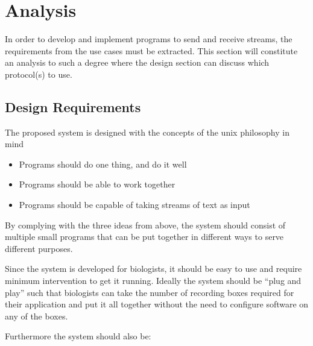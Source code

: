 \chapter{Analysis}
In order to develop and implement programs to send and receive streams, the requirements from the use cases must be extracted.
This section will constitute an analysis to such a degree where the design section can discuss which protocol(s) to use.

\section{Design Requirements}
The proposed system is designed with the concepts of the unix philosophy in mind
\begin{itemize}
	\item Programs should do one thing, and do it well
	\item Programs should be able to work together
	\item Programs should be capable of taking streams of text as input
\end{itemize}

By complying with the three ideas from above, the system should consist of multiple small programs that can be put together in different ways to serve different purposes.

Since the system is developed for biologists, it should be easy to use and require minimum intervention to get it running. Ideally the system should be “plug and play” such that biologists can take the number of recording boxes required for their application and put it all together without the need to configure software on any of the boxes. 




Furthermore the system should also be:


